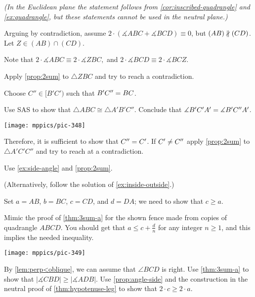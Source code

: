 \textit{(In the Euclidean plane the statement follows from \ref{cor:inscribed-quadrangle} and \ref{ex:quadrangle},
but these statements cannot be used in the neutral plane.)}

Arguing by contradiction, 
assume 
$2\cdot(\measuredangle ABC+\measuredangle BCD)\equiv0$, 
but $(AB)\nparallel(C D)$.
Let $Z\in (AB)\cap(CD)$.

Note that 
$
2\cdot \measuredangle ABC\equiv 2\cdot \measuredangle ZBC,
$ and
$2\cdot \measuredangle BCD\equiv 2\cdot \measuredangle BCZ$.

Apply \ref{prop:2sum} to $\triangle ZBC$ and try to reach a contradiction.

Choose $C''\in [B'C')$ such that $B'C''=BC$.

Use SAS to show that $\triangle ABC\cong \triangle A'B'C''$.
Conclude that $\measuredangle B'C'A'= \measuredangle B'C''A'$.

\begin{Figure}
\vskip-0mm
\centering
\texttt{[image: mppics/pic-348]}
\end{Figure}

Therefore, it is sufficient to show that $C''=C'$.
If $C'\ne C''$ apply \ref{prop:2sum} to $\triangle A'C'C''$ and try to reach at a contradiction.



Use \ref{ex:side-angle} and \ref{prop:2sum}.

(Alternatively, follow the solution of \ref{ex:inside-outside}.)

Set $a=AB$, $b=BC$, $c=CD$, and $d=DA$; we need to show that $c\ge a$.

Mimic the proof of \ref{thm:3sum-a} for the shown fence made from copies of quadrangle $ABCD$.
You should get that $a\le c+\tfrac dn$ for any integer $n\ge 1$, and this implies the needed inequality.

\begin{Figure}
\vskip-0mm
\centering
\texttt{[image: mppics/pic-349]}
\end{Figure}

By \ref{lem:perp<oblique}, we can assume that $\angle BCD$ is right.
Use \ref{thm:3sum-a} to show that $|\measuredangle CBD|\ge|\measuredangle ADB|$.
Use \ref{prop:angle-side} and the construction in the neutral proof of \ref{thm:hypotenuse-leg} to show that $2\cdot c\ge 2\cdot a$.

